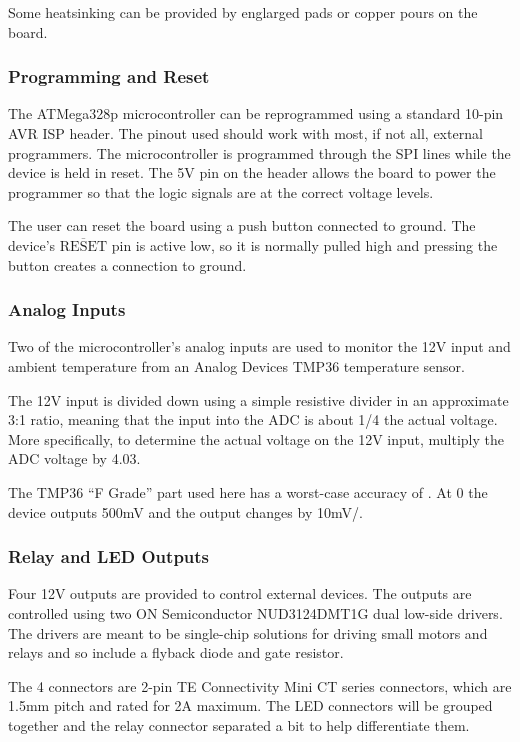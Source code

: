 \documentclass{article}
\newcommand{\textoverline}[1]{$\overline{\mbox{#1}}$}
\begin{document}
Some heatsinking can be provided by englarged pads or copper pours on the board.

\subsubsection{Programming and Reset} \label{sssec:ProgReset}
The ATMega328p microcontroller can be reprogrammed using a standard 10-pin AVR ISP header.  The
pinout used should work with most, if not all, external programmers.  The microcontroller is
programmed through the SPI lines while the device is held in reset.  The 5V pin on the header allows
the board to power the programmer so that the logic signals are at the correct voltage levels.

The user can reset the board using a push button connected to ground.  The device's
\textoverline{RESET} pin is active low, so it is normally pulled high and pressing the button
creates a connection to ground.

\subsubsection{Analog Inputs} \label{sssec:AnalogIn}
Two of the microcontroller's analog inputs are used to monitor the 12V input and ambient temperature
from an Analog Devices TMP36 temperature sensor.

The 12V input is divided down using a simple resistive divider in an approximate 3:1 ratio, meaning that the
input into the ADC is about 1/4 the actual voltage.  More specifically, to determine the actual
voltage on the 12V input, multiply the ADC voltage by 4.03.

The TMP36 ``F Grade'' part used here has a worst-case accuracy of \textcelsius{}.  At
0\textcelsius{} the device outputs 500mV and the output changes by 10mV/\textcelsius{}.

\subsubsection{Relay and LED Outputs} \label{sssec:RelayLED} 
Four 12V outputs are provided to control external devices.  The outputs are controlled using two ON
Semiconductor NUD3124DMT1G dual low-side drivers.  The drivers are meant to be single-chip solutions
for driving small motors and relays and so include a flyback diode and gate resistor.

The 4 connectors are 2-pin TE Connectivity Mini CT series connectors, which are 1.5mm pitch and
rated for 2A maximum.  The LED connectors will be grouped together and the relay connector separated
a bit to help differentiate them.
\end{document}
